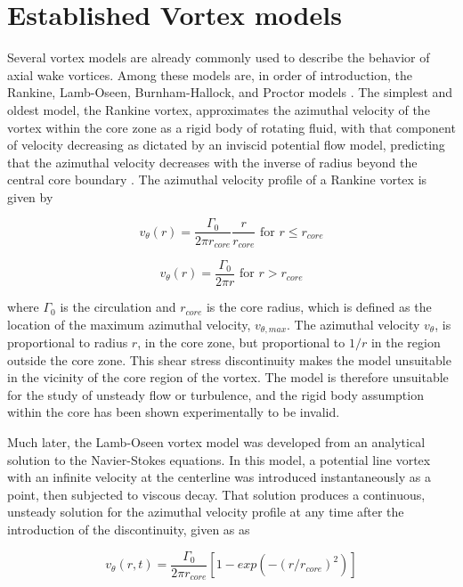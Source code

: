 \section{Established Vortex models}
Several vortex models are already commonly used to describe the behavior of 
axial wake vortices. Among these models are, in order of introduction, the 
Rankine, Lamb-Oseen, Burnham-Hallock, and Proctor models \cite{ahmad2014}. The 
simplest and oldest model, the Rankine vortex, approximates the azimuthal 
velocity of the vortex within the core zone as a rigid body of rotating fluid, 
with that component of velocity decreasing as dictated by an inviscid potential 
flow model, predicting that the azimuthal velocity decreases with the inverse 
of radius beyond the central core boundary \cite{rankine1869}. The azimuthal 
velocity profile of a Rankine vortex is given by

\begin{equation}
v_{\theta}(r) = \frac{\Gamma_0}{2 \pi r_{core}} \frac{r}{r_{core}} 
	\text{ for } r \leq r_{core}
	\label{eq:rankine1}
\end{equation}

\begin{equation}
v_{\theta}(r) = \frac{\Gamma_0}{2 \pi r}
	\text{ for } r > r_{core}
	\label{eq:rankine2}
\end{equation}

\noindent
where $\Gamma_0$ is the circulation and $r_{core}$ is the core radius,
which is defined as the location of the maximum azimuthal velocity, 
$v_{\theta, max}$. The azimuthal velocity $v_{\theta}$, is proportional to 
radius $r$, in the core zone, but proportional to $1/r$ in the region outside 
the core zone. This shear stress discontinuity makes the model unsuitable in 
the vicinity of the core region of the vortex. The model is therefore 
unsuitable for the study of unsteady flow or turbulence, and the rigid body 
assumption within the core has been shown experimentally to be invalid.

Much later, the Lamb-Oseen vortex model was developed from an 
analytical solution to the Navier-Stokes equations. In this model, a potential 
line vortex with an infinite velocity at the centerline was introduced 
instantaneously as a point, then subjected to viscous decay. That solution 
produces a continuous, unsteady solution for the azimuthal 
velocity profile at any time after the introduction of the discontinuity, given 
as as

\begin{equation}
v_{\theta}(r,t) = \frac{\Gamma_0}{2 \pi r_{core}}[1 - 
							exp(-(r / r_{core})^2)]
	\label{eq:lamb1}
\end{equation}

